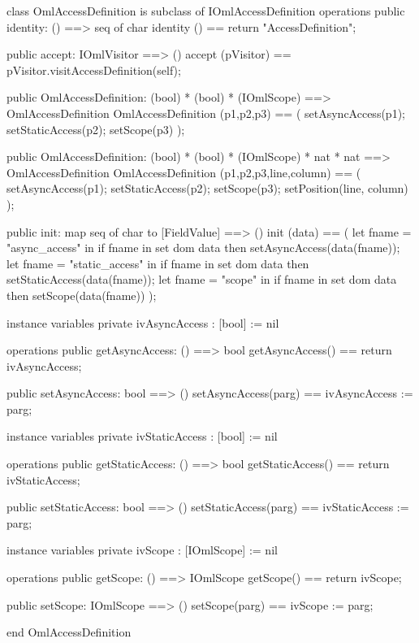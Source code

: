 \begin{vdm_al}
class OmlAccessDefinition is subclass of IOmlAccessDefinition
operations
  public identity: () ==> seq of char
  identity () == return "AccessDefinition";

  public accept: IOmlVisitor ==> ()
  accept (pVisitor) == pVisitor.visitAccessDefinition(self);

  public OmlAccessDefinition:
    (bool) *
    (bool) *
    (IOmlScope) ==> OmlAccessDefinition
  OmlAccessDefinition (p1,p2,p3) == 
    ( setAsyncAccess(p1);
      setStaticAccess(p2);
      setScope(p3) );

  public OmlAccessDefinition:
    (bool) *
    (bool) *
    (IOmlScope) *
    nat *
    nat ==> OmlAccessDefinition
  OmlAccessDefinition (p1,p2,p3,line,column) == 
    ( setAsyncAccess(p1);
      setStaticAccess(p2);
      setScope(p3);
      setPosition(line, column) );

  public init: map seq of char to [FieldValue] ==> ()
  init (data) ==
    ( let fname = "async_access" in
        if fname in set dom data
        then setAsyncAccess(data(fname));
      let fname = "static_access" in
        if fname in set dom data
        then setStaticAccess(data(fname));
      let fname = "scope" in
        if fname in set dom data
        then setScope(data(fname)) );

instance variables
  private ivAsyncAccess : [bool] := nil

operations
  public getAsyncAccess: () ==> bool
  getAsyncAccess() == return ivAsyncAccess;

  public setAsyncAccess: bool ==> ()
  setAsyncAccess(parg) == ivAsyncAccess := parg;

instance variables
  private ivStaticAccess : [bool] := nil

operations
  public getStaticAccess: () ==> bool
  getStaticAccess() == return ivStaticAccess;

  public setStaticAccess: bool ==> ()
  setStaticAccess(parg) == ivStaticAccess := parg;

instance variables
  private ivScope : [IOmlScope] := nil

operations
  public getScope: () ==> IOmlScope
  getScope() == return ivScope;

  public setScope: IOmlScope ==> ()
  setScope(parg) == ivScope := parg;

end OmlAccessDefinition
\end{vdm_al}

